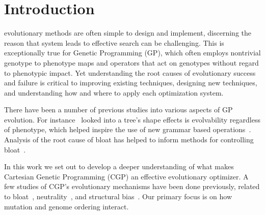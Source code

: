 \documentclass[journal]{IEEEtran}
\begin{document}
%
\IEEEpeerreviewmaketitle



\section{Introduction}
% 
% 
% 
% 
 evolutionary methods are often simple to design
and implement, discerning the reason that system
leads to effective search can be challenging.
This is exceptionally
true for Genetic Programming (GP), which often employs nontrivial
genotype to phenotype maps and operators that act on genotypes without regard to
phenotypic impact.  Yet understanding the root causes of evolutionary success
and failure is critical to improving existing techniques, designing new techniques,
and understanding how and where to apply each optimization system.

There have been a number of previous studies into various aspects of GP evolution.
For instance~\cite{daida3:2003:treebias} looked into a tree's shape effects is evolvability
regardless of phenotype,
which helped inspire the use of new grammar based operations~\cite{xuan:2006:grammar}.
Analysis of the root cause of bloat has helped to inform methods for controlling
bloat~\cite{luke:2006:bloat}.

In this work we set out to develop a deeper understanding of what makes Cartesian
Genetic Programming (CGP) an effective evolutionary optimizer.
A few studies of CGP's evolutionary mechanisms have
been done previously, related to bloat~\cite{miller:2001:bloat},
neutrality~\cite{vassilev:2000:neutrality}, and structural bias~\cite{payne:2009:bias}.
Our primary focus is
on how mutation and genome ordering interact.
\end{document}
